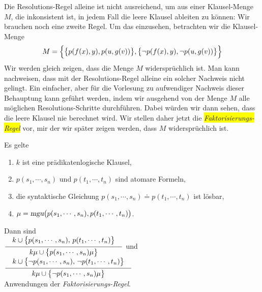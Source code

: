 \noindent
Die Resolutions-Regel alleine ist nicht ausreichend, um aus einer Klausel-Menge $M$, die
inkonsistent ist, in 
jedem Fall die leere Klausel ableiten zu k\"{o}nnen: Wir brauchen noch eine zweite Regel.
Um das einzusehen, betrachten wir die Klausel-Menge 
\[ M = \Bigl\{ \bigl\{p(f(x),y), p(u,g(v))\bigr\}, 
               \bigl\{\neg p(f(x),y), \neg p(u,g(v))\bigr\} \Bigr\} 
\]
Wir werden gleich zeigen, dass die Menge $M$ widerspr\"{u}chlich ist.  Man kann nachweisen,
dass mit der Resolutions-Regel alleine ein solcher Nachweis nicht gelingt.
Ein einfacher, aber f\"{u}r die Vorlesung zu aufwendiger Nachweis dieser Behauptung kann
gef\"{u}hrt werden, indem wir ausgehend von der Menge $M$ alle m\"{o}glichen Resolutions-Schritte
durchf\"{u}hren.  Dabei w\"{u}rden wir dann sehen, dass die leere Klausel nie berechnet wird.
Wir stellen daher jetzt die
\colorbox{yellow}{\emph{Faktorisierungs-Regel}} vor, mir der wir sp\"{a}ter zeigen werden, dass $M$ widerspr\"{u}chlich
ist.

\begin{Definition}[Faktorisierung] Es gelte 
  \begin{enumerate}
  \item $k$ ist  eine pr\"{a}dikatenlogische Klausel,
  \item $p(s_1,\cdots,s_n)$ und $p(t_1,\cdots,t_n)$ sind atomare Formeln,
  \item die syntaktische Gleichung $p(s_1,\cdots,s_n)  \doteq p(t_1,\cdots,t_n)$ ist l\"{o}sbar, 
  \item $\mu = \textsl{mgu}\bigl(p(s_1,\cdots,s_n), p(t_1,\cdots,t_n)\bigr)$.
  \end{enumerate}
  Dann sind \\[0.3cm]
  \hspace*{0.8cm}
  $\schluss{k \cup \bigl\{p(s_1,\cdots,s_n),\, p(t_1,\cdots,t_n)\bigl\}}{k\mu \cup \bigl\{p(s_1,\cdots,s_n)\mu\bigr\} }$ 
  \quad und \quad
  $\schluss{k \cup \bigl\{ \neg p(s_1,\cdots,s_n),\, \neg p(t_1,\cdots,t_n)\bigl\}}{k\mu \cup \bigl\{\neg p(s_1,\cdots,s_n)\mu\bigr\} }$ 
  \\[0.3cm]
  Anwendungen der \emph{Faktorisierungs-Regel}.
  \eox
\end{Definition}

